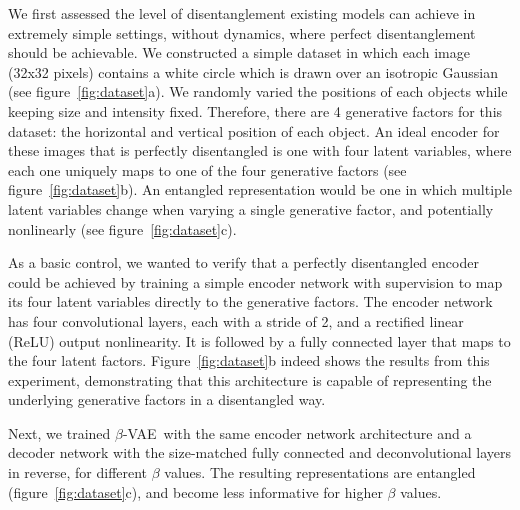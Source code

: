 \documentclass[10pt,letterpaper]{article}
\newcommand{\bvae}{$\beta$-VAE~}
\begin{document}
We first assessed the level of disentanglement existing models can achieve in extremely simple settings, without dynamics,  where perfect disentanglement should be achievable. We constructed a simple dataset in which each image (32x32 pixels) contains a white circle which is drawn over an isotropic Gaussian (see figure~\ref{fig:dataset}a). We randomly varied the positions of each objects while keeping size and intensity fixed. Therefore, there are 4 generative factors for this dataset: the horizontal and vertical position of each object. An ideal encoder for these images that is perfectly disentangled is one with four latent variables, where each one uniquely maps to one of the four generative factors (see figure~\ref{fig:dataset}b). An entangled representation would be one in which multiple latent variables change when varying a single generative factor, and potentially nonlinearly (see figure~\ref{fig:dataset}c).

As a basic control, we wanted to verify that a perfectly disentangled encoder could be achieved by training a simple encoder network with supervision to map its four latent variables directly to the generative factors. The encoder network has four convolutional layers, each with a stride of 2, and a rectified linear (ReLU) output nonlinearity. It is followed by a fully connected layer that maps to the four latent factors. Figure~\ref{fig:dataset}b indeed shows the results from this experiment, demonstrating that this architecture is capable of representing the underlying generative factors in a disentangled way.

Next, we trained \bvae with the same encoder network architecture and a decoder network with the size-matched fully connected and deconvolutional layers in reverse, for different $\beta$ values. The resulting representations are entangled (figure~\ref{fig:dataset}c), and become less informative for higher $\beta$ values.
\end{document}
